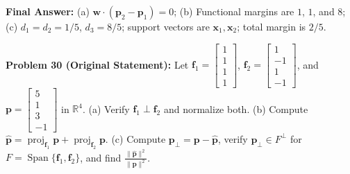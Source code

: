 \documentclass[11pt, letterpaper]{article}
\theoremstyle{definition}
\theoremstyle{remark}
\begin{document}
\begin{center}
\end{center}

\textbf{Final Answer:} (a) $\mathbf{w} \cdot (\mathbf{p}_2 - \mathbf{p}_1) = 0$; (b) Functional margins are $1$, $1$, and $8$; (c) $d_1 = d_2 = 1/5$, $d_3 = 8/5$; support vectors are $\mathbf{x}_1, \mathbf{x}_2$; total margin is $2/5$.

\medskip
\textbf{Problem 30 (Original Statement):} Let $\mathbf{f}_1 = \begin{bmatrix} 1 \\ 1 \\ 1 \\ 1 \end{bmatrix}$, $\mathbf{f}_2 = \begin{bmatrix} 1 \\ -1 \\ 1 \\ -1 \end{bmatrix}$, and $\mathbf{p} = \begin{bmatrix} 5 \\ 1 \\ 3 \\ -1 \end{bmatrix}$ in $\mathbb{R}^4$. (a) Verify $\mathbf{f}_1 \perp \mathbf{f}_2$ and normalize both. (b) Compute $\hat{\mathbf{p}} = \operatorname{proj}_{\mathbf{f}_1}\mathbf{p} + \operatorname{proj}_{\mathbf{f}_2}\mathbf{p}$. (c) Compute $\mathbf{p}_{\perp} = \mathbf{p} - \hat{\mathbf{p}}$, verify $\mathbf{p}_{\perp} \in F^{\perp}$ for $F = \operatorname{Span}\{\mathbf{f}_1, \mathbf{f}_2\}$, and find $\frac{\|\hat{\mathbf{p}}\|^2}{\|\mathbf{p}\|^2}$.
\end{document}
